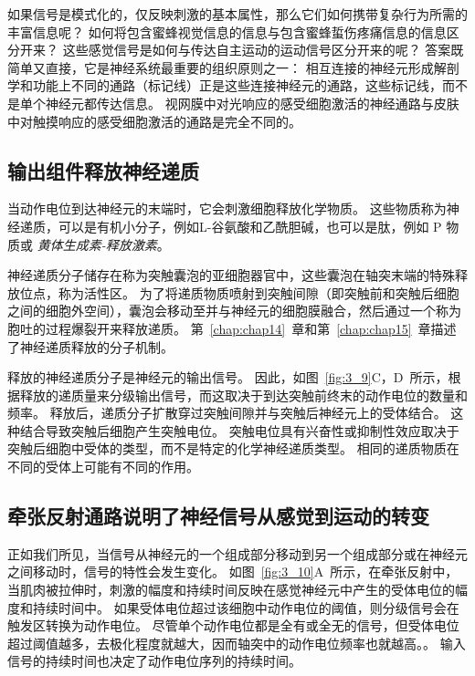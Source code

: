 如果信号是模式化的，仅反映刺激的基本属性，那么它们如何携带复杂行为所需的丰富信息呢？
如何将包含蜜蜂视觉信息的信息与包含蜜蜂蜇伤疼痛信息的信息区分开来？
这些感觉信号是如何与传达自主运动的运动信号区分开来的呢？
答案既简单又直接，它是神经系统最重要的组织原则之一：
相互连接的神经元形成解剖学和功能上不同的通路（标记线）正是这些连接神经元的通路，这些标记线，而不是单个神经元都传达信息。 
视网膜中对光响应的感受细胞激活的神经通路与皮肤中对触摸响应的感受细胞激活的通路是完全不同的。


\subsection{输出组件释放神经递质}

当动作电位到达神经元的末端时，它会刺激细胞释放化学物质。
这些物质称为神经递质，可以是有机小分子，例如L-谷氨酸和乙酰胆碱，也可以是肽，例如 P 物质或 \textit{黄体生成素-释放激素}。


神经递质分子储存在称为突触囊泡的亚细胞器官中，这些囊泡在轴突末端的特殊释放位点，称为活性区。
为了将递质物质喷射到突触间隙（即突触前和突触后细胞之间的细胞外空间），囊泡会移动至并与神经元的细胞膜融合，然后通过一个称为胞吐的过程爆裂开来释放递质。
第~\ref{chap:chap14}~章和第~\ref{chap:chap15}~章描述了神经递质释放的分子机制。


释放的神经递质分子是神经元的输出信号。 
因此，如图~\ref{fig:3_9}C，D~所示，根据释放的递质量来分级输出信号，而这取决于到达突触前终末的动作电位的数量和频率。
释放后，递质分子扩散穿过突触间隙并与突触后神经元上的受体结合。
这种结合导致突触后细胞产生突触电位。
突触电位具有兴奋性或抑制性效应取决于突触后细胞中受体的类型，而不是特定的化学神经递质类型。
相同的递质物质在不同的受体上可能有不同的作用。



\subsection{牵张反射通路说明了神经信号从感觉到运动的转变}

正如我们所见，当信号从神经元的一个组成部分移动到另一个组成部分或在神经元之间移动时，信号的特性会发生变化。 
如图~\ref{fig:3_10}A~所示，在牵张反射中，当肌肉被拉伸时，刺激的幅度和持续时间反映在感觉神经元中产生的受体电位的幅度和持续时间中。
如果受体电位超过该细胞中动作电位的阈值，则分级信号会在触发区转换为动作电位。
尽管单个动作电位都是全有或全无的信号，但受体电位超过阈值越多，去极化程度就越大，因而轴突中的动作电位频率也就越高。。
输入信号的持续时间也决定了动作电位序列的持续时间。


